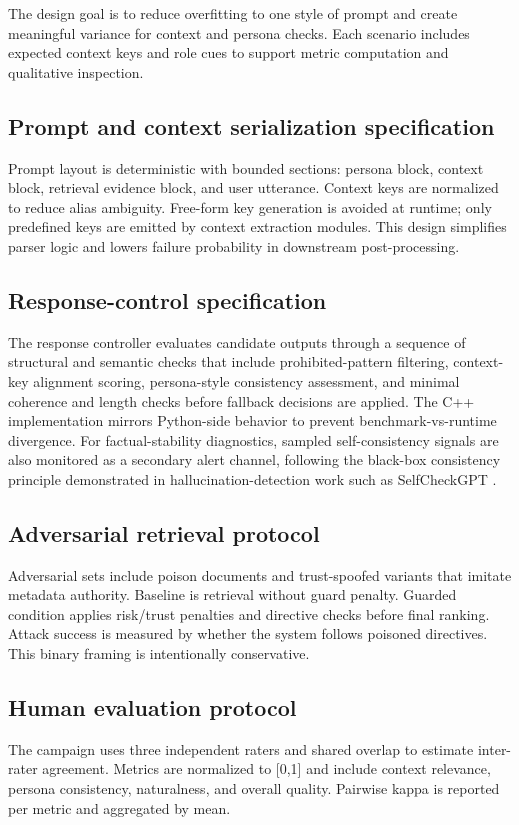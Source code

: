﻿\documentclass[a4paper,12pt]{article}
\begin{document}
The design goal is to reduce overfitting to one style of prompt and create meaningful variance for context and persona checks. Each scenario includes expected context keys and role cues to support metric computation and qualitative inspection.

\subsection{Prompt and context serialization specification}
Prompt layout is deterministic with bounded sections: persona block, context block, retrieval evidence block, and user utterance. Context keys are normalized to reduce alias ambiguity. Free-form key generation is avoided at runtime; only predefined keys are emitted by context extraction modules. This design simplifies parser logic and lowers failure probability in downstream post-processing.

\subsection{Response-control specification}
The response controller evaluates candidate outputs through a sequence of structural and semantic checks that include prohibited-pattern filtering, context-key alignment scoring, persona-style consistency assessment, and minimal coherence and length checks before fallback decisions are applied. The C++ implementation mirrors Python-side behavior to prevent benchmark-vs-runtime divergence. For factual-stability diagnostics, sampled self-consistency signals are also monitored as a secondary alert channel, following the black-box consistency principle demonstrated in hallucination-detection work such as SelfCheckGPT \cite{Manakul2023SelfCheckGPT}.

\subsection{Adversarial retrieval protocol}
Adversarial sets include poison documents and trust-spoofed variants that imitate metadata authority. Baseline is retrieval without guard penalty. Guarded condition applies risk/trust penalties and directive checks before final ranking. Attack success is measured by whether the system follows poisoned directives. This binary framing is intentionally conservative.

\subsection{Human evaluation protocol}
The campaign uses three independent raters and shared overlap to estimate inter-rater agreement. Metrics are normalized to [0,1] and include context relevance, persona consistency, naturalness, and overall quality. Pairwise kappa is reported per metric and aggregated by mean.
\end{document}
